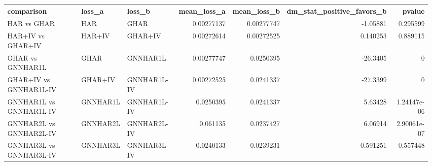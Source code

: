 \begin{tabular}{lllrrrr}
\toprule
comparison & loss_a & loss_b & mean_loss_a & mean_loss_b & dm_stat_positive_favors_b & pvalue \\
\midrule
HAR vs GHAR & HAR & GHAR & 0.00277137 & 0.00277747 & -1.05881 & 0.295599 \\
HAR+IV vs GHAR+IV & HAR+IV & GHAR+IV & 0.00272614 & 0.00272525 & 0.140253 & 0.889115 \\
GHAR vs GNNHAR1L & GHAR & GNNHAR1L & 0.00277747 & 0.0250395 & -26.3405 & 0 \\
GHAR+IV vs GNNHAR1L-IV & GHAR+IV & GNNHAR1L-IV & 0.00272525 & 0.0241337 & -27.3399 & 0 \\
GNNHAR1L vs GNNHAR1L-IV & GNNHAR1L & GNNHAR1L-IV & 0.0250395 & 0.0241337 & 5.63428 & 1.24147e-06 \\
GNNHAR2L vs GNNHAR2L-IV & GNNHAR2L & GNNHAR2L-IV & 0.061135 & 0.0237427 & 6.06914 & 2.90061e-07 \\
GNNHAR3L vs GNNHAR3L-IV & GNNHAR3L & GNNHAR3L-IV & 0.0240133 & 0.0239231 & 0.591251 & 0.557448 \\
\bottomrule
\end{tabular}

